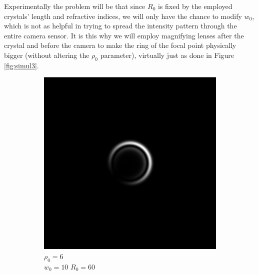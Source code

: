 \documentclass[11pt, a4paper, twoside]{article} %
\begin{document}
Experimentally the problem will be that since $R_0$ is fixed by the employed crystals' length and refractive indices, we will only have the chance to modify $w_0$, which is not as helpful in trying to spread the intensity pattern through the entire camera sensor. It is this why we will employ magnifying lenses after the crystal and before the camera to make the ring of the focal point physically bigger (without altering the $\rho_0$ parameter), virtually just as done in Figure \ref{fig:simul3}.
\begin{figure}[h!] 
     \centering 
    \begin{subfigure}[b]{0.245\linewidth}
    \includegraphics[width=\linewidth]{simul31.png}
    \caption{$\rho_0=6$\\ $w_0=10$ $R_0=60$}
     \end{subfigure}
 \begin{subfigure}[b]{0.245\linewidth}

\end{subfigure}
\end{figure}
\end{document}
